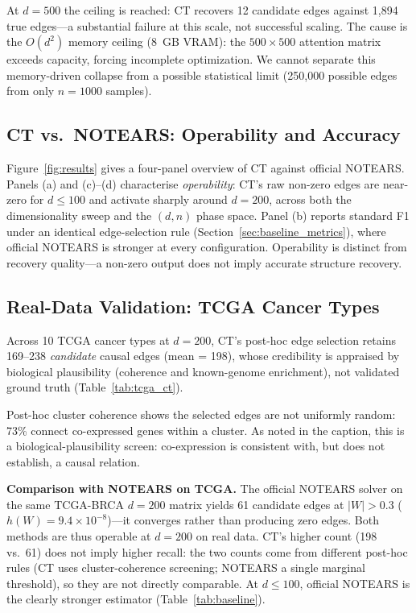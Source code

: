 \documentclass[12pt,a4paper]{article}
\begin{document}
At $d=500$ the ceiling is reached: CT recovers 12 candidate edges against 1,894 true edges---a substantial failure at this scale, not successful scaling. The cause is the $O(d^2)$ memory ceiling (8~GB VRAM): the $500\times500$ attention matrix exceeds capacity, forcing incomplete optimization. We cannot separate this memory-driven collapse from a possible statistical limit (250,000 possible edges from only $n=1000$ samples).

\subsection{CT vs.\ NOTEARS: Operability and Accuracy}
Figure~\ref{fig:results} gives a four-panel overview of CT against official NOTEARS. Panels (a) and (c)--(d) characterise \emph{operability}: CT's raw non-zero edges are near-zero for $d\le100$ and activate sharply around $d=200$, across both the dimensionality sweep and the $(d,n)$ phase space. Panel (b) reports standard F1 under an identical edge-selection rule (Section~\ref{sec:baseline_metrics}), where official NOTEARS is stronger at every configuration. Operability is distinct from recovery quality---a non-zero output does not imply accurate structure recovery.

\subsection{Real-Data Validation: TCGA Cancer Types}\label{sec:tcga_validation}

Across 10 TCGA cancer types at $d=200$, CT's post-hoc edge selection retains 169--238 \emph{candidate} causal edges (mean = 198), whose credibility is appraised by biological plausibility (coherence and known-genome enrichment), not validated ground truth (Table~\ref{tab:tcga_ct}).

Post-hoc cluster coherence shows the selected edges are not uniformly random: 73\% connect co-expressed genes within a cluster. As noted in the caption, this is a biological-plausibility screen: co-expression is consistent with, but does not establish, a causal relation.

\textbf{Comparison with NOTEARS on TCGA.} The official NOTEARS solver on the same TCGA-BRCA $d=200$ matrix yields 61 candidate edges at $|W|>0.3$ ($h(W)=9.4\times10^{-8}$)---it converges rather than producing zero edges. Both methods are thus operable at $d=200$ on real data. CT's higher count (198 vs.\ 61) does not imply higher recall: the two counts come from different post-hoc rules (CT uses cluster-coherence screening; NOTEARS a single marginal threshold), so they are not directly comparable. At $d\le100$, official NOTEARS is the clearly stronger estimator (Table~\ref{tab:baseline}).
\end{document}
